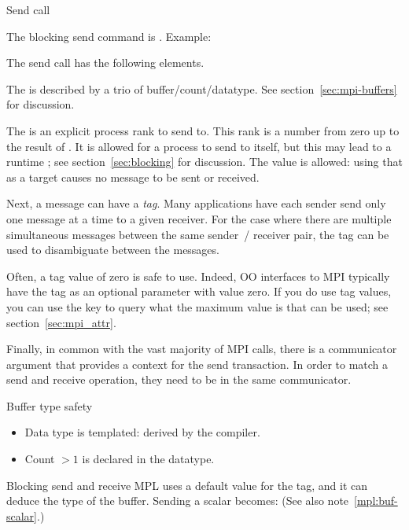  {Send call}

The blocking send command is
%
.
%
Example:

The send call has the following elements.

The  is described by a trio of buffer/count/datatype.
See section~\ref{sec:mpi-buffers} for discussion.

The   is an
explicit process rank to send to.  This rank is a number from zero up
to the result of .
It is allowed for a process to send to itself, but
this may lead to a runtime ;
see section~\ref{sec:blocking} for discussion.
The value  is allowed:
using that as a target causes no message to be sent
or received.

Next, a message can have a
\emph{tag}.
Many applications have each sender send only one message at a time
to a given receiver.
For the case where there are
multiple simultaneous messages between the same sender~/ receiver pair,
the tag can be used to disambiguate between
the messages.

Often, a tag value of zero is safe to use.
Indeed, \ac{OO} interfaces to MPI typically have  the tag
as an optional parameter with value zero.
If you do
use tag values, you can use the key  to query
what the maximum value is that can be used; see
section~\ref{sec:mpi_attr}.

Finally, in common with the vast majority of MPI calls,
there is a communicator argument that provides a context for the send transaction.
In order to match a send and receive operation,
they need to be in the same communicator.

\begin{mplnote}{Buffer type safety}
  \begin{itemize}
  \item Data type is templated: derived by the compiler.
  \item Count $>1$ is declared in the datatype.
  \end{itemize}
\end{mplnote}

\begin{mplnote}{Blocking send and receive}
  \ac{MPL} uses a default value for the tag, and it can deduce the type
  of the buffer. Sending a scalar becomes:
  (See also note~\ref{mpl:buf-scalar}.)
\end{mplnote}

